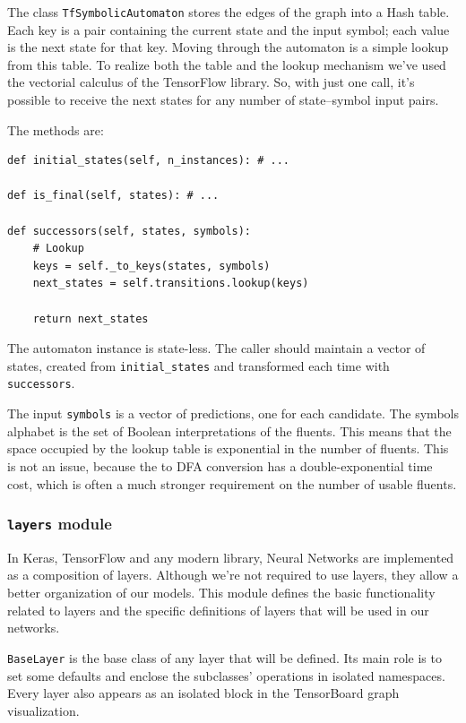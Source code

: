 The class \texttt{TfSymbolicAutomaton} stores the edges of the graph into a
Hash table. Each key is a pair containing the current state and the input
symbol; each value is the next state for that key. Moving through the
automaton is a simple lookup from this table. To realize both the table and
the lookup mechanism we've used the vectorial calculus of the TensorFlow
library. So, with just one call, it's possible to receive the next states for
any number of state--symbol input pairs.

The methods are:
\begin{verbatim}
def initial_states(self, n_instances): # ...

def is_final(self, states): # ...

def successors(self, states, symbols):
	# Lookup
	keys = self._to_keys(states, symbols)
	next_states = self.transitions.lookup(keys)
	
	return next_states
\end{verbatim}
The automaton instance is state-less. The caller should maintain a vector of
states, created from \verb|initial_states| and transformed each time with
\texttt{successors}.

The input \texttt{symbols} is a vector of predictions, one for each candidate.
The symbols alphabet is the set of Boolean interpretations of the fluents.
This means that the space occupied by the lookup table is exponential in the
number of fluents. This is not an issue, because the \ldl{} to DFA conversion
has a double-exponential time cost, which is often a much stronger requirement
on the number of usable fluents.


\subsubsection*{\texttt{layers} module}

In Keras, TensorFlow and any modern library, Neural Networks are implemented
as a composition of layers. Although we're not required to use layers, they
allow a better organization of our models. This module defines the basic
functionality related to layers and the specific definitions of layers that
will be used in our networks.

\texttt{BaseLayer} is the base class of any layer that will be defined.
Its main role is to set some defaults and enclose the subclasses' operations
in isolated namespaces. Every layer also appears as an isolated block in the
TensorBoard graph visualization.


